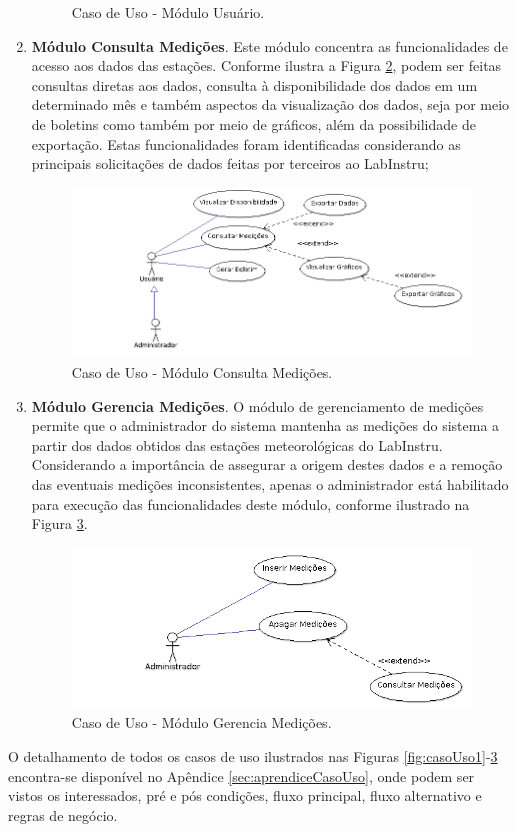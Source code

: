 \begin{enumerate}
\begin{figure}[H]
		\caption{Caso de Uso - Módulo Usuário.}
		\label{fig:casoUso2}
	\end{figure}
	\item \textbf{Módulo Consulta Medições}. Este módulo concentra as funcionalidades de acesso aos dados das estações. Conforme ilustra a Figura \ref{fig:casoUso3}, podem ser feitas consultas diretas aos dados, consulta à disponibilidade dos dados em um determinado mês e também aspectos da visualização dos dados, seja por meio de boletins como também por meio de gráficos, além da possibilidade de exportação. Estas funcionalidades foram identificadas considerando as principais solicitações de dados feitas por terceiros ao LabInstru;
	\begin{figure}[H]
		\centering
		\includegraphics[scale=0.8]{img/uc003.png}
		\caption{Caso de Uso - Módulo Consulta Medições.}
		\label{fig:casoUso3}
	\end{figure}
	\item \textbf{Módulo Gerencia Medições}. O módulo de gerenciamento de medições permite que o administrador do sistema mantenha as medições do sistema a partir dos dados obtidos das estações meteorológicas do LabInstru. Considerando a importância de assegurar a origem destes dados e a remoção das eventuais medições inconsistentes, apenas o administrador está habilitado para execução das funcionalidades deste módulo, conforme ilustrado na Figura \ref{fig:casoUso4}.
	\begin{figure}[H]
		\centering
		\includegraphics[scale=0.8]{img/uc004.png}
		\caption{Caso de Uso - Módulo Gerencia Medições.}
		\label{fig:casoUso4}
	\end{figure}
\end{enumerate}

O detalhamento de todos os casos de uso ilustrados nas Figuras \ref{fig:casoUso1}-\ref{fig:casoUso4} encontra-se disponível no Apêndice \ref{sec:aprendiceCasoUso},  onde podem ser vistos os interessados, pré e pós condições, fluxo principal, fluxo alternativo e regras de negócio.
